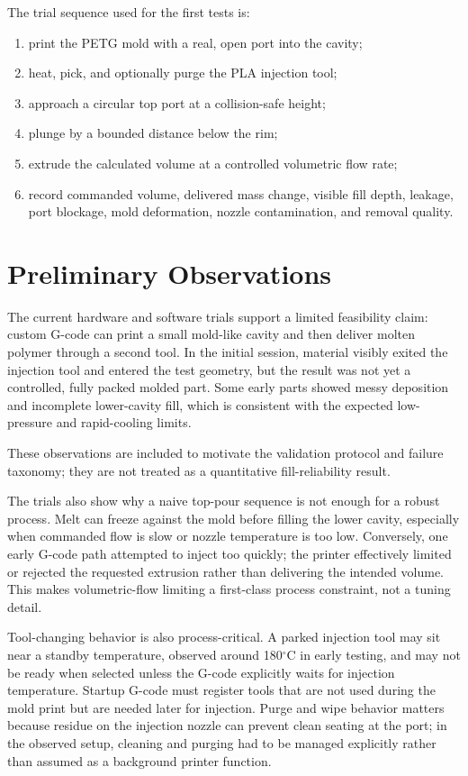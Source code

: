 \documentclass[conference]{IEEEtran}
\begin{document}
The trial sequence used for the first tests is:
\begin{enumerate}
\item print the PETG mold with a real, open port into the cavity;
\item heat, pick, and optionally purge the PLA injection tool;
\item approach a circular top port at a collision-safe height;
\item plunge by a bounded distance below the rim;
\item extrude the calculated volume at a controlled volumetric flow rate;
\item record commanded volume, delivered mass change, visible fill depth, leakage, port blockage, mold deformation, nozzle contamination, and removal quality.
\end{enumerate}

\section{Preliminary Observations}
The current hardware and software trials support a limited feasibility claim: custom G-code can print a small mold-like cavity and then deliver molten polymer through a second tool. In the initial session, material visibly exited the injection tool and entered the test geometry, but the result was not yet a controlled, fully packed molded part. Some early parts showed messy deposition and incomplete lower-cavity fill, which is consistent with the expected low-pressure and rapid-cooling limits.

These observations are included to motivate the validation protocol and failure taxonomy; they are not treated as a quantitative fill-reliability result.

The trials also show why a naive top-pour sequence is not enough for a robust process. Melt can freeze against the mold before filling the lower cavity, especially when commanded flow is slow or nozzle temperature is too low. Conversely, one early G-code path attempted to inject too quickly; the printer effectively limited or rejected the requested extrusion rather than delivering the intended volume. This makes volumetric-flow limiting a first-class process constraint, not a tuning detail.

Tool-changing behavior is also process-critical. A parked injection tool may sit near a standby temperature, observed around 180$^\circ$C in early testing, and may not be ready when selected unless the G-code explicitly waits for injection temperature. Startup G-code must register tools that are not used during the mold print but are needed later for injection. Purge and wipe behavior matters because residue on the injection nozzle can prevent clean seating at the port; in the observed setup, cleaning and purging had to be managed explicitly rather than assumed as a background printer function.
\end{document}
